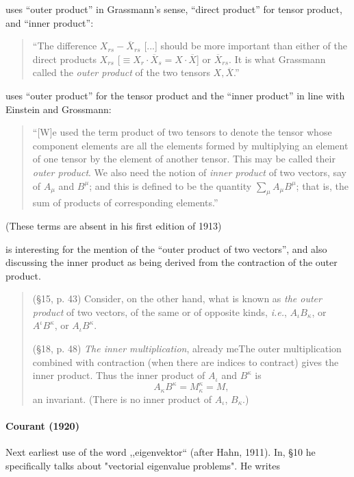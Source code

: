 \cite[p. 25]{Murnaghan1922} uses ``outer product'' in Grassmann's sense, ``direct product'' for tensor product, and ``inner product'':
\begin{quote}
``The difference $X_{rs} - \overline X_{rs}$ [...] should be more important than either of the direct products $X_{rs}$ [$\equiv X_r \cdot \overline X_s = X \cdot \overline X$] or $\overline X_{rs}$. It is what Grassmann called the \textit{outer product} of the two tensors $X, \overline X$.''
\end{quote}

\cite[p. 87]{Carmichael1920} uses ``outer product'' for the tensor product and the ``inner product'' in line with Einstein and Grossmann:
\begin{quote}
``[W]e used the term product of two tensors to denote the tensor whose component elements are all the elements formed by multiplying an element of one tensor by the element of another tensor. This may be called their \textit{outer product}. We also need the notion of \textit{inner product} of two vectors, say of $A_\mu$ and $B^\mu$; and this is defined to be the quantity $\sum_\mu A_\mu B^\mu$; that is, the sum of products of corresponding elements.''
\end{quote}
(These terms are absent in his first edition of 1913)

\cite{Silberstein1922} is interesting for the mention of the ``outer product of two vectors'', and also discussing the inner product as being derived from the contraction of the outer product.
\begin{quote}
(\S 15, p. 43) Consider, on the other hand, what is known as \textit{the outer product} of two vectors, of the same or of opposite kinds, \textit{i.e.}, $A_\iota B_\kappa$, or $A^\iota B^\kappa$, or $A_\iota B^\kappa$.

(\S 18, p. 48) \textit{The inner multiplication}, already meThe outer multiplication combined with contraction (when there are indices to contract) gives the inner product. Thus the inner product of $A_\iota$ and $B^\kappa$ is
\[
A_\kappa B^\kappa = M^\kappa_\kappa = M,
\]
an invariant. (There is no inner product of $A_\iota$, $B_\kappa$.)
\end{quote}



\paragraph{Courant (1920)}

Next earliest use of the word ,,eigenvektor`` (after Hahn, 1911).
In, \S 10 he specifically talks about "vectorial eigenvalue problems". He writes


